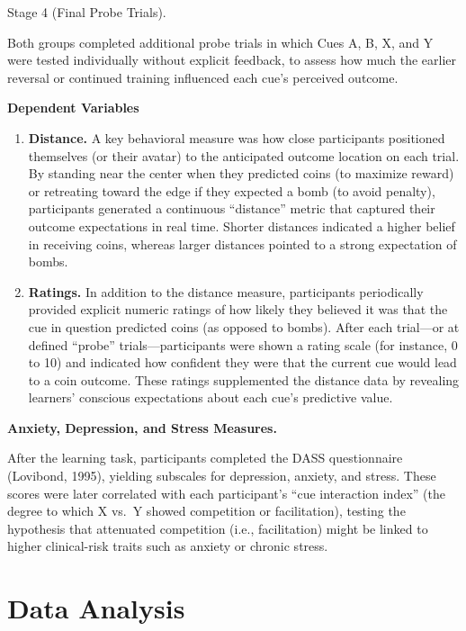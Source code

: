 \documentclass[
  letterpaper,
  DIV=11,
  numbers=noendperiod]{scrartcl}
\begin{document}
Stage 4 (Final Probe Trials).

Both groups completed additional probe trials in which Cues A, B, X, and
Y were tested individually without explicit feedback, to assess how much
the earlier reversal or continued training influenced each cue's
perceived outcome.

\textbf{Dependent Variables}

\begin{enumerate}
\def\labelenumi{\arabic{enumi}.}
\item
  \textbf{Distance.} A key behavioral measure was how close participants
  positioned themselves (or their avatar) to the anticipated outcome
  location on each trial. By standing near the center when they
  predicted coins (to maximize reward) or retreating toward the edge if
  they expected a bomb (to avoid penalty), participants generated a
  continuous ``distance'' metric that captured their outcome
  expectations in real time. Shorter distances indicated a higher belief
  in receiving coins, whereas larger distances pointed to a strong
  expectation of bombs.
\item
  \textbf{Ratings.} In addition to the distance measure, participants
  periodically provided explicit numeric ratings of how likely they
  believed it was that the cue in question predicted coins (as opposed
  to bombs). After each trial---or at defined ``probe''
  trials---participants were shown a rating scale (for instance, 0 to
  10) and indicated how confident they were that the current cue would
  lead to a coin outcome. These ratings supplemented the distance data
  by revealing learners' conscious expectations about each cue's
  predictive value.
\end{enumerate}

\textbf{Anxiety, Depression, and Stress Measures.}

After the learning task, participants completed the DASS questionnaire
(Lovibond, 1995), yielding subscales for depression, anxiety, and
stress. These scores were later correlated with each participant's ``cue
interaction index'' (the degree to which X vs.~Y showed competition or
facilitation), testing the hypothesis that attenuated competition (i.e.,
facilitation) might be linked to higher clinical-risk traits such as
anxiety or chronic stress.

\section{Data Analysis}\label{data-analysis}
\end{document}
